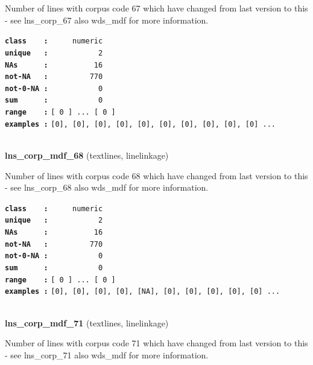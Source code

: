 \documentclass[]{article}
\begin{document}
Number of lines with corpus code 67 which have changed from last version
to this - see lns\_corp\_67 also wds\_mdf for more information.

\textbf{\texttt{class\ \ \ \ :}} \texttt{~~~~~numeric}\\
\textbf{\texttt{unique\ \ \ :}} \texttt{~~~~~~~~~~~2}\\
\textbf{\texttt{NAs\ \ \ \ \ \ :}} \texttt{~~~~~~~~~~16}\\
\textbf{\texttt{not-NA\ \ \ :}} \texttt{~~~~~~~~~770}\\
\textbf{\texttt{not-0-NA\ :}} \texttt{~~~~~~~~~~~0}\\
\textbf{\texttt{sum\ \ \ \ \ \ :}} \texttt{~~~~~~~~~~~0}\\
\textbf{\texttt{range\ \ \ \ :}}
\texttt{{[}\ 0\ {]}\ ...\ {[}\ 0\ {]}}\\
\textbf{\texttt{examples\ :}}
\texttt{{[}0{]},\ {[}0{]},\ {[}0{]},\ {[}0{]},\ {[}0{]},\ {[}0{]},\ {[}0{]},\ {[}0{]},\ {[}0{]},\ {[}0{]}\ ...}\\

~

\textbf{lns\_corp\_mdf\_68} (textlines, linelinkage)

Number of lines with corpus code 68 which have changed from last version
to this - see lns\_corp\_68 also wds\_mdf for more information.

\textbf{\texttt{class\ \ \ \ :}} \texttt{~~~~~numeric}\\
\textbf{\texttt{unique\ \ \ :}} \texttt{~~~~~~~~~~~2}\\
\textbf{\texttt{NAs\ \ \ \ \ \ :}} \texttt{~~~~~~~~~~16}\\
\textbf{\texttt{not-NA\ \ \ :}} \texttt{~~~~~~~~~770}\\
\textbf{\texttt{not-0-NA\ :}} \texttt{~~~~~~~~~~~0}\\
\textbf{\texttt{sum\ \ \ \ \ \ :}} \texttt{~~~~~~~~~~~0}\\
\textbf{\texttt{range\ \ \ \ :}}
\texttt{{[}\ 0\ {]}\ ...\ {[}\ 0\ {]}}\\
\textbf{\texttt{examples\ :}}
\texttt{{[}0{]},\ {[}0{]},\ {[}0{]},\ {[}0{]},\ {[}NA{]},\ {[}0{]},\ {[}0{]},\ {[}0{]},\ {[}0{]},\ {[}0{]}\ ...}\\

~

\textbf{lns\_corp\_mdf\_71} (textlines, linelinkage)

Number of lines with corpus code 71 which have changed from last version
to this - see lns\_corp\_71 also wds\_mdf for more information.
\end{document}
